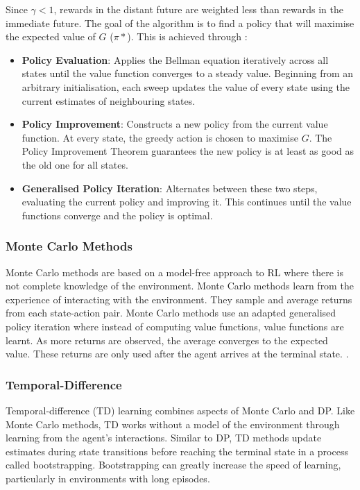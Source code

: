 Since $\gamma < 1$, rewards in the distant future are weighted less than rewards in the immediate future. The goal of the algorithm is to find a policy that will maximise the expected value of $G$ ($\pi*$). This is achieved through \cite{sutton2018reinforcement}: \par

\begin{itemize}
    \item \textbf{Policy Evaluation}: Applies the Bellman equation iteratively across all states until the value function converges to a steady value. Beginning from an arbitrary initialisation, each sweep updates the value of every state using the current estimates of neighbouring states.
   
    \item \textbf{Policy Improvement}: Constructs a new policy from the current value function. At every state, the greedy action is chosen to maximise $G$. The Policy Improvement Theorem guarantees the new policy is at least as good as the old one for all states.
    
    \item \textbf{Generalised Policy Iteration}: Alternates between these two steps, evaluating the current policy and improving it. This continues until the value functions converge and the policy is optimal.
\end{itemize}


\subsubsection{Monte Carlo Methods}
Monte Carlo methods are based on a model-free approach to RL where there is not complete knowledge of the environment. Monte Carlo methods learn from the experience of interacting with the environment. They sample and average returns from each state-action pair. Monte Carlo methods use an adapted generalised policy iteration where instead of computing value functions, value functions are learnt. As more returns are observed, the average converges to the expected value. These returns are only used after the agent arrives at the terminal state.
\cite{sutton2018reinforcement}.

\subsubsection{Temporal-Difference}
Temporal-difference (TD) learning combines aspects of Monte Carlo and DP. Like Monte Carlo methods, TD works without a model of the environment through learning from the agent's interactions. Similar to DP, TD methods update estimates during state transitions before reaching the terminal state in a process called bootstrapping. Bootstrapping can greatly increase the speed of learning, particularly in environments with long episodes. \cite{sutton2018reinforcement}

